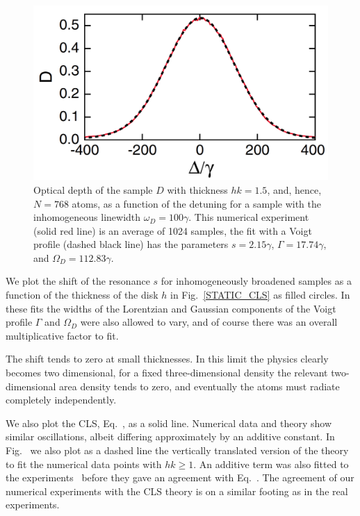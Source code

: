 \begin{figure}[h!]
\begin{center}
\includegraphics[width=\textwidth]{inhomo_D.pdf}
\end{center}
\caption{Optical depth of the sample $D$ with thickness $hk=1.5$, and, hence, $N=768$ atoms, as a function of the detuning for a sample with the inhomogeneous linewidth $\omega_D=100\gamma$. This numerical experiment (solid red line) is an average of 1024 samples, the fit with a Voigt profile (dashed black line) has the parameters $s=2.15\gamma$, $\Gamma=17.74\gamma$, and $\Omega_D=112.83\gamma$.}
\label{INHOMO_D}
\end{figure}

We plot the shift of the resonance $s$ for inhomogeneously broadened samples as a function of the thickness of the disk $h$ in Fig.~\ref{STATIC_CLS} as filled circles.  In these fits the widths of the Lorentzian and Gaussian components of the Voigt profile $\Gamma$ and $\Omega_D$ were also allowed to vary, and of course there was an overall multiplicative factor to fit.

The shift tends to zero at small thicknesses. In this limit the physics clearly becomes two dimensional, for a fixed three-dimensional density the relevant two-dimensional area density tends to zero, and eventually the atoms must radiate completely independently. 

We also plot the CLS, Eq.~, as a solid line. Numerical data and theory show similar oscillations, albeit differing approximately by an additive constant. In Fig.~ we also plot as a dashed line the vertically translated version of the theory to fit the numerical data points with $hk\geq 1$. An additive term was also fitted to the experiments~\cite{PhysRevLett.108.173601} before they gave an agreement with Eq.~. The agreement of our numerical experiments with the CLS theory is on a similar footing as in the real experiments.


